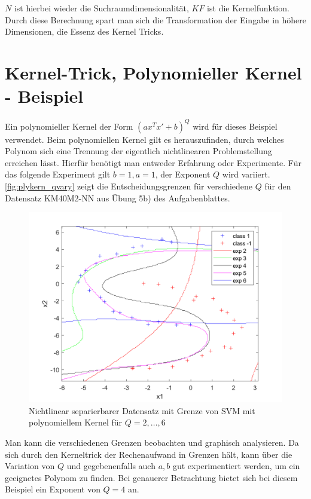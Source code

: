 \documentclass[a4paper,11pt,twoside]{scrreprt}
\begin{document}
$N$ ist hierbei wieder die Suchraumdimensionalität, $KF$ ist die Kernelfunktion.
Durch diese Berechnung spart man sich die Transformation der Eingabe in höhere Dimensionen, die Essenz des Kernel Tricks.

\section{Kernel-Trick, Polynomieller Kernel - Beispiel}\label{sec:plykernbsp}
Ein polynomieller Kernel der Form $(a x^{T}x' + b)^{Q}$ wird für dieses Beispiel verwendet.
Beim polynomiellen Kernel gilt es herauszufinden, durch welches Polynom sich eine Trennung der eigentlich nichtlinearen Problemstellung erreichen lässt.
Hierfür benötigt man entweder Erfahrung oder Experimente.
Für das folgende Experiment gilt $b = 1, a = 1$, der Exponent $Q$ wird variiert. %
\autoref{fig:plykern_qvary} zeigt die Entscheidungsgrenzen für verschiedene $Q$ für den Datensatz KM40M2-NN aus Übung 5b) des Aufgabenblattes. %
\begin{figure}[H]
    \centering
    \includegraphics[width = 16cm]{../code/octave/images/kernelexptest}
    \caption{Nichtlinear separierbarer Datensatz mit Grenze von \ac{SVM} mit polynomiellem Kernel für $Q=2,\ldots,6$}
    \label{fig:plykern_qvary}
\end{figure}
Man kann die verschiedenen Grenzen beobachten und graphisch analysieren.
Da sich durch den Kerneltrick der Rechenaufwand in Grenzen hält, kann über die Variation von $Q$ und gegebenenfalls auch $a, b$ gut experimentiert werden, um ein geeignetes Polynom zu finden.
Bei genauerer Betrachtung bietet sich bei diesem Beispiel ein Exponent von $Q=4$ an.
\end{document}
